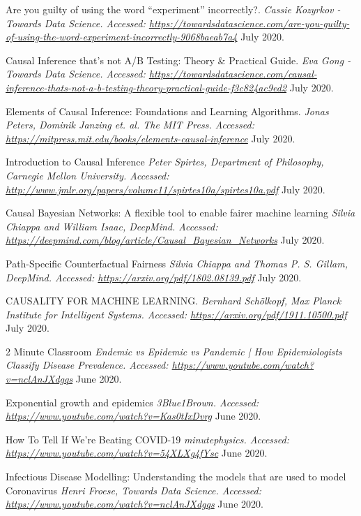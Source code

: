 \begin{thebibliography}{1}
 Are you guilty of using the word “experiment” incorrectly?. {\em Cassie Kozyrkov - Towards Data Science. Accessed:  \url{https://towardsdatascience.com/are-you-guilty-of-using-the-word-experiment-incorrectly-9068baeab7a4}} July 2020.

 Causal Inference that’s not A/B Testing: Theory & Practical Guide. {\em Eva Gong - Towards Data Science. Accessed:  \url{https://towardsdatascience.com/causal-inference-thats-not-a-b-testing-theory-practical-guide-f3c824ac9ed2}} July 2020.

 Elements of Causal Inference: Foundations and Learning Algorithms. {\em  Jonas Peters, Dominik Janzing et. al. The MIT Press. Accessed:  \url{https://mitpress.mit.edu/books/elements-causal-inference}} July 2020.

Introduction to Causal Inference
{\em Peter Spirtes, Department of Philosophy, Carnegie Mellon University. Accessed:  \url{http://www.jmlr.org/papers/volume11/spirtes10a/spirtes10a.pdf}} July 2020.

Causal Bayesian Networks: A flexible tool to enable fairer machine learning
{\em Silvia Chiappa and William Isaac, DeepMind. Accessed:  \url{https://deepmind.com/blog/article/Causal_Bayesian_Networks}} July 2020.

Path-Specific Counterfactual Fairness
{\em Silvia Chiappa and Thomas P. S. Gillam, DeepMind. Accessed:  \url{https://arxiv.org/pdf/1802.08139.pdf}} July 2020.

 CAUSALITY FOR MACHINE LEARNING. {\em Bernhard Schölkopf, Max Planck Institute for Intelligent Systems. Accessed:  \url{https://arxiv.org/pdf/1911.10500.pdf}} July 2020.

 2 Minute Classroom {\em Endemic vs Epidemic vs Pandemic | How Epidemiologists Classify Disease Prevalence. Accessed:  \url{https://www.youtube.com/watch?v=nclAnJXdgqs}} June 2020.

 Exponential growth and epidemics {\em 3Blue1Brown. Accessed:  \url{https://www.youtube.com/watch?v=Kas0tIxDvrg}} June 2020.

 How To Tell If We're Beating COVID-19 {\em 
minutephysics. Accessed:  \url{https://www.youtube.com/watch?v=54XLXg4fYsc}} June 2020.

 Infectious Disease Modelling: Understanding the models that are used to model Coronavirus {\em Henri Froese, Towards Data Science. Accessed:  \url{https://www.youtube.com/watch?v=nclAnJXdgqs}} June 2020.


\end{thebibliography}
